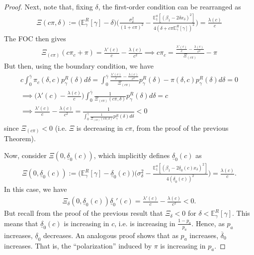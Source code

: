 \documentclass[11pt,dvipsnames]{article}
\begin{document}
\begin{appendix}
\begin{proof}
Next, note that, fixing $\delta$, the first-order condition can be rearranged as
\begin{align*}
\Xi(c\pi,\delta)
:= 
\big(\mathbb{E}_\gamma^R[\gamma]-\delta\big)
\big(\frac{\sigma_\delta^2}{(1+c\pi)^2}
-\frac{\mathbb{E}_1^a[(\beta_1-2\delta x_\delta)^2]}{4(\delta + c\pi \mathbb{E}_\gamma^R[\gamma])^2}\big)
= \frac{\lambda(c)}{c}
\end{align*}
The FOC then gives
\begin{align*}
\Xi_{(c\pi)}(c\pi_c +\pi)
= \frac{\lambda'(c)}{c}-\frac{\lambda(c)}{c^2}
\implies
c\pi_c = \frac{\frac{\lambda'(c)}{c}-\frac{\lambda(c)}{c^2}}{\Xi_{(c\pi)}}-\pi
\end{align*}
But then, using the boundary condition, we have
\begin{align*}
c\int_0^{\overline{\gamma}} \pi_c(\delta,c)p_\gamma^R(\delta)d\delta
=
\int_0^{\overline{\gamma}} \frac{\frac{\lambda'(c)}{c}-\frac{\lambda(c)}{c^2}}{\Xi_{(c\pi)}}p_\gamma^R(\delta)-\pi(\delta,c)p_\gamma^R(\delta)d\delta=0
\\
\implies \bigg(\lambda'(c)-\frac{\lambda(c)}{c}\bigg)\int_0^{\overline{\gamma}}
\frac{1}{\Xi_{(c\pi)}(c\pi,\delta)}p_\gamma^R(\delta)d\delta= c
\\
\implies
\frac{\lambda'(c)}{c}-\frac{\lambda(c)}{c^2} = \frac{1}{\int_0^{\overline{\gamma}}
\frac{1}{\Xi_{(c\pi)}(c\pi,\delta)}p_\gamma^R(\delta)d\delta} < 0
\end{align*}
since $\Xi_{(c\pi)} < 0$ (i.e. $\Xi$ is decreasing in $c\pi$, from the proof of the previous Theorem).

Now, consider $\Xi(0,\underline{\delta}_0(c))$, which implicitly defines $\underline{\delta}_0(c)$ as
\begin{align*}
\Xi(0,\underline{\delta}_0(c))
:= 
\big(\mathbb{E}_\gamma^R[\gamma]-\underline{\delta}_0(c)\big)
\big(\sigma_\delta^2
-\frac{\mathbb{E}_1^a[(\beta_1-2\underline{\delta}_0(c) x_\delta)^2]}{4(\underline{\delta}_0(c) )^2}\big)
= \frac{\lambda(c)}{c}.	
\end{align*}
In this case, we have
\begin{align*}
\Xi_{\delta}(0,\underline{\delta}_0(c))\underline{\delta}_0'(c) = \frac{\lambda'(c)}{c}-\frac{\lambda(c)}{c^2}
< 0.
\end{align*}
But recall from the proof of the previous result that $\Xi_\delta < 0$ for $\delta < \mathbb{E}_\gamma^R[\gamma]$.
This means that $\underline{\delta}_0(c)$ is increasing in $c$, i.e. is increasing in $\frac{1-p_a}{p_a}$. Hence, as $p_a$ increases, $\underline{\delta}_0$ decreases.
An analogous proof shows that as $p_a$ increases, $\overline{\delta}_0$ increases.
That is, the ``polarization'' induced by $\pi$ is increasing in $p_a$.


\end{proof}
\end{appendix}
\end{document}
